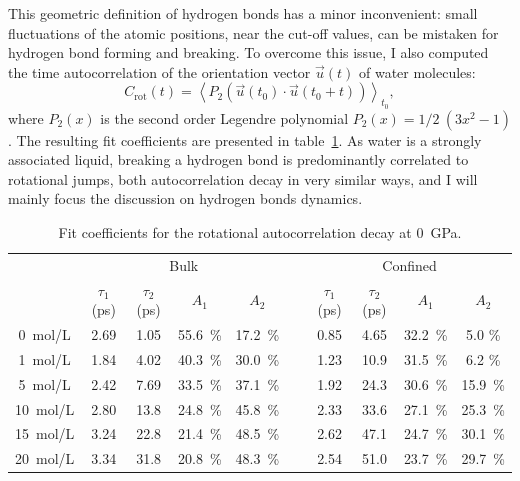 \documentclass[thesis]{subfiles}
\begin{document}
This geometric definition of hydrogen bonds has a minor inconvenient: small
fluctuations of the atomic positions, near the cut-off values, can be mistaken
for hydrogen bond forming and breaking. To overcome this issue, I also
computed the time autocorrelation of the orientation vector $\vec u(t)$ of
water molecules:
\[C_{\text{rot}}(t) = \left\langle P_2(\vec u(t_0) \cdot \vec u(t_0 + t)) \right\rangle_{t_0} ,\]
where $P_2(x)$ is the second order Legendre polynomial $P_2(x) = 1/2\ (3x^2 -
1)$\cite{Fogarty2014}. The resulting fit coefficients are presented in
table~\ref{table:licl-zif:rotcf}. As water is a strongly associated liquid,
breaking a hydrogen bond is predominantly correlated to rotational jumps, both
autocorrelation decay in very similar ways, and I will mainly focus the
discussion on hydrogen bonds dynamics.

%     

\begin{table}[ht]
    \caption{Fit coefficients for the rotational autocorrelation decay at \SI{0}{GPa}.}
    \label{table:licl-zif:rotcf}
    \centering
    \begin{tabular}{c c c c c c c c c c}
        \toprule
        \multicolumn{1}{c}{~} & \multicolumn{4}{c}{Bulk}                          &~& \multicolumn{4}{c}{Confined} \\
        \multicolumn{1}{c}{~} & $\tau_1$ (ps) & $\tau_2$ (ps) & $A_1$   & $A_2$   &~& $\tau_1$ (ps) & $\tau_2$ (ps) & $A_1$   & $A_2$   \\
        \midrule
        \SI{0}{mol/L}         &    2.69       &    1.05       & 55.6~\% & 17.2~\% &~&    0.85       &     4.65      &  32.2~\% &  5.0  \% \\
        \SI{1}{mol/L}         &    1.84       &    4.02       & 40.3~\% & 30.0~\% &~&    1.23       &     10.9      &  31.5~\% &  6.2  \% \\
        \SI{5}{mol/L}         &    2.42       &    7.69       & 33.5~\% & 37.1~\% &~&    1.92       &     24.3      &  30.6~\% &  15.9~\% \\
        \SI{10}{mol/L}        &    2.80       &    13.8       & 24.8~\% & 45.8~\% &~&    2.33       &     33.6      &  27.1~\% &  25.3~\% \\
        \SI{15}{mol/L}        &    3.24       &    22.8       & 21.4~\% & 48.5~\% &~&    2.62       &     47.1      &  24.7~\% &  30.1~\% \\
        \SI{20}{mol/L}        &    3.34       &    31.8       & 20.8~\% & 48.3~\% &~&    2.54       &     51.0      &  23.7~\% &  29.7~\% \\
        \bottomrule
    \end{tabular}
\end{table}
\end{document}

